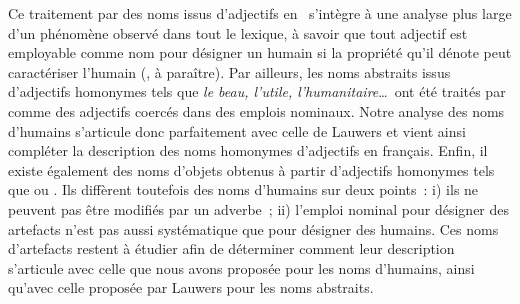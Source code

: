 \documentclass[output=paper]{LSP/langsci}
\begin{document}
Ce traitement par  des noms issus d'adjectifs en \iste\  s'intègre à une analyse plus large d'un phénomène observé dans tout le lexique, à savoir que tout adjectif  est employable comme nom pour désigner un humain si la propriété qu'il dénote peut caractériser l'humain (\citeauthor{amiottribout17}, à paraître). Par ailleurs,​ les noms abstraits issus d'adjectifs homonymes tels que \textit{le beau, l'utile, l'humanitaire}\ldots\ ont été traités par \cite{lauwers08, lauwers14b} comme des adjectifs coercés dans des emplois nominaux. Notre analyse des noms d'humains s'articule donc parfaitement avec celle de Lauwers et vient ainsi compléter la description des noms homonymes d'adjectifs en français. Enfin, il existe également des noms d'objets obtenus à partir d'adjectifs homonymes tels que  ou . Ils diffèrent toutefois des noms d'humains sur deux points~: i) ils ne peuvent pas être modifiés par un adverbe~; ii) l'emploi nominal pour désigner des artefacts n'est pas aussi systématique que pour désigner des humains. Ces noms d'artefacts restent à étudier afin de déterminer comment leur description s'articule avec celle que nous avons proposée pour les noms d'humains, ainsi qu'avec celle proposée par Lauwers pour les noms abstraits.


{\sloppy
    \printbibliography[heading=subbibliography,notkeyword=this]
}
\end{document}
